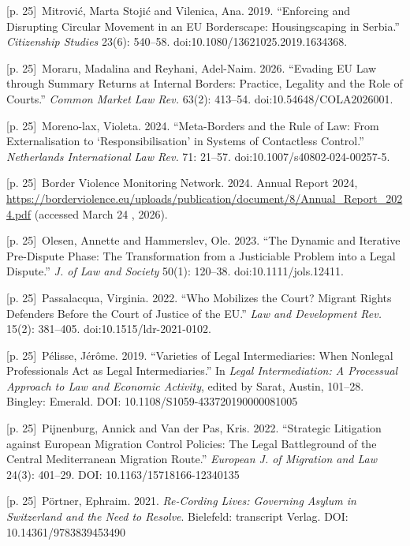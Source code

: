 \documentclass[10pt,a4paper]{article}
\begin{document}
{\scriptsize\color{gray} [p. 25]}\ Mitrović, Marta Stojić and Vilenica, Ana. 2019. “Enforcing and Disrupting Circular Movement in an EU Borderscape: Housingscaping in Serbia.” \textit{Citizenship Studies} 23(6): 540–58. doi:10.1080/13621025.2019.1634368.\par
{\scriptsize\color{gray} [p. 25]}\ Moraru, Madalina and Reyhani, Adel-Naim. 2026. “Evading EU Law through Summary Returns at Internal Borders: Practice, Legality and the Role of Courts.” \textit{Common Market Law Rev.} 63(2): 413–54. doi:10.54648/COLA2026001.\par
{\scriptsize\color{gray} [p. 25]}\ Moreno-lax, Violeta. 2024. “Meta-Borders and the Rule of Law: From Externalisation to ‘Responsibilisation’ in Systems of Contactless Control.” \textit{Netherlands International Law Rev.} 71: 21–57. doi:10.1007/s40802-024-00257-5.\par
{\scriptsize\color{gray} [p. 25]}\ Border Violence Monitoring Network. 2024. Annual Report 2024, \url{https://borderviolence.eu/uploads/publication/document/8/Annual_Report_2024.pdf} (accessed March 24 , 2026).\par
{\scriptsize\color{gray} [p. 25]}\ Olesen, Annette and Hammerslev, Ole. 2023. “The Dynamic and Iterative Pre-Dispute Phase: The Transformation from a Justiciable Problem into a Legal Dispute.” \textit{J. of Law and Society} 50(1): 120–38. doi:10.1111/jols.12411.\par
{\scriptsize\color{gray} [p. 25]}\ Passalacqua, Virginia. 2022. “Who Mobilizes the Court? Migrant Rights Defenders Before the Court of Justice of the EU.” \textit{Law and Development Rev.} 15(2): 381–405. doi:10.1515/ldr-2021-0102.\par
{\scriptsize\color{gray} [p. 25]}\ Pélisse, Jérôme. 2019. “Varieties of Legal Intermediaries: When Nonlegal Professionals Act as Legal Intermediaries.” In \textit{Legal Intermediation: A Processual Approach to Law and Economic Activity}, edited by Sarat, Austin, 101–28. Bingley: Emerald. DOI: 10.1108/S1059-433720190000081005\par
{\scriptsize\color{gray} [p. 25]}\ Pijnenburg, Annick and Van der Pas, Kris. 2022. “Strategic Litigation against European Migration Control Policies: The Legal Battleground of the Central Mediterranean Migration Route.” \textit{European J. of Migration and Law} 24(3): 401–29. DOI: 10.1163/15718166-12340135\par
{\scriptsize\color{gray} [p. 25]}\ Pörtner, Ephraim. 2021. \textit{Re-Cording Lives: Governing Asylum in Switzerland and the Need to Resolve}. Bielefeld: transcript Verlag. DOI: 10.14361/9783839453490\par
\end{document}
